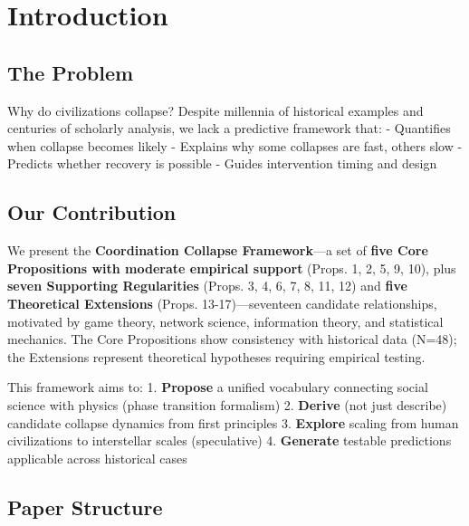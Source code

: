 \documentclass[11pt,letterpaper]{article}
\begin{document}
\section{Introduction}\label{sec:introduction}

\subsection{The Problem}\label{sec:the-problem}

Why do civilizations collapse? Despite millennia of historical examples
and centuries of scholarly analysis, we lack a predictive framework
that: - Quantifies when collapse becomes likely - Explains why some
collapses are fast, others slow - Predicts whether recovery is possible
- Guides intervention timing and design

\subsection{Our Contribution}\label{sec:our-contribution}

We present the \textbf{Coordination Collapse Framework}---a set of
\textbf{five Core Propositions with moderate empirical support} (Props.
1, 2, 5, 9, 10), plus \textbf{seven Supporting Regularities} (Props. 3,
4, 6, 7, 8, 11, 12) and \textbf{five Theoretical Extensions} (Props.
13-17)---seventeen candidate relationships, motivated by game theory,
network science, information theory, and statistical mechanics. The Core
Propositions show consistency with historical data (N=48); the
Extensions represent theoretical hypotheses requiring empirical testing.

This framework aims to: 1. \textbf{Propose} a unified vocabulary
connecting social science with physics (phase transition formalism) 2.
\textbf{Derive} (not just describe) candidate collapse dynamics from
first principles 3. \textbf{Explore} scaling from human civilizations to
interstellar scales (speculative) 4. \textbf{Generate} testable
predictions applicable across historical cases

\subsection{Paper Structure}\label{sec:paper-structure}
\end{document}
